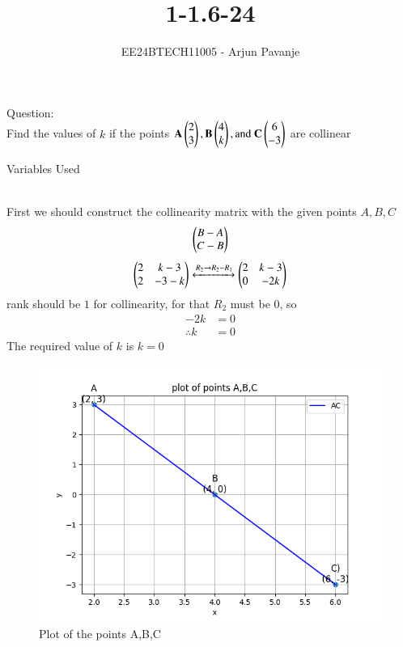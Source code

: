 \documentclass[journal]{IEEEtran}
\begin{document}

\vspace{3cm}

\title{1-1.6-24}
\author{EE24BTECH11005 - Arjun Pavanje
}
{\let\newpage\relax\maketitle}
Question:\\
Find the values of $k$ if the points $\mathbf{A}\begin{pmatrix}2\\3\end{pmatrix}, \mathbf{B}\begin{pmatrix}4\\k\end{pmatrix}, \text{and } \mathbf{C}\begin{pmatrix}6\\-3\end{pmatrix}$ are collinear\\
\solution
\begin{table}[h!]    
  \centering
  
  \caption{Variables Used}
  \label{tab1-1.5-29}
\end{table}\\
First we should construct the collinearity matrix with the given points $A,B,C$
\begin{align}
\begin{pmatrix}
B-A \\
C-B
\end{pmatrix}
\end{align}
\begin{align}
\begin{pmatrix}
2 & k-3\\
2 & -3-k
\end{pmatrix}
\xleftrightarrow[]{R_2 \rightarrow {R_2-R_1}}
\begin{pmatrix}
2 & k-3\\
0 & -2k
\end{pmatrix}
\end{align}
rank should be $1$ for collinearity, for that $R_2$ must be 0, so
\begin{align}
	-2k&=0\\
	\therefore k&=0
\end{align}
The required value of $k$ is $k=0$ 
\begin{figure}[h!]
   \centering
   \includegraphics[width=0.7\linewidth]{figs/fig.png}
   \caption{Plot of the points A,B,C}
   \label{stemplot}
\end{figure}
\end{document}
